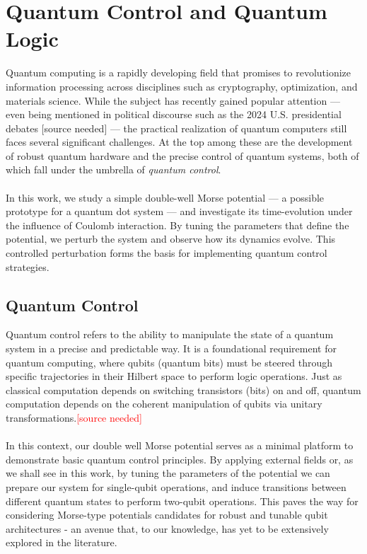 \documentclass{subfiles}
\begin{document}
\section{Quantum Control and Quantum Logic}
Quantum computing is a rapidly developing field that promises to revolutionize information processing across disciplines such as cryptography, optimization, and materials science. While the subject has recently gained popular attention — even being mentioned in political discourse such as the 2024 U.S. presidential debates [source needed] — the practical realization of quantum computers still faces several significant challenges. At the top among these are the development of robust quantum hardware and the precise control of quantum systems, both of which fall under the umbrella of \emph{quantum control}. \\ \\
In this work, we study a simple double-well Morse potential — a possible prototype for a quantum dot system — and investigate its time-evolution under the influence of Coulomb interaction. By tuning the parameters that define the potential, we perturb the system and observe how its dynamics evolve. This controlled perturbation forms the basis for implementing quantum control strategies.

\subsection{Quantum Control}
Quantum control refers to the ability to manipulate the state of a quantum system in a precise and predictable way. It is a foundational requirement for quantum computing, where qubits (quantum bits) must be steered through specific trajectories in their Hilbert space to perform logic operations. Just as classical computation depends on switching transistors (bits) on and off, quantum computation depends on the coherent manipulation of qubits via unitary transformations.\textcolor{red}{[source needed]} \\ \\In this context, our double well Morse potential serves as a minimal platform to demonstrate basic quantum control principles. By applying external fields or, as we shall see in this work, by tuning the parameters of the potential we can prepare our system for single-qubit operations, and induce transitions between different quantum states to perform two-qubit operations. This paves the way for considering Morse-type potentials candidates for robust and tunable qubit architectures - an avenue that, to our knowledge, has yet to be extensively explored in the literature. \\ \\ 
\end{document}

